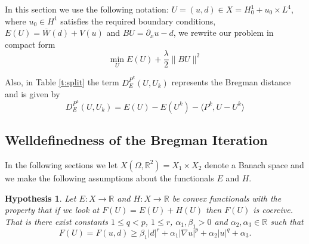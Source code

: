 \documentclass[11pt]{article}
\newcommand{\R}{\mathbb{R}}
\theoremstyle{plain}
\newtheorem{Hypothesis}[Lemma]{Hypothesis}
\begin{document}
\begin{table}[t]
    \centering
    \qquad     
    \caption{\footnotesize A) Bregman iteration. B) Error correcting algorithm.}
    \label{t:algorithms}
 \end{table}

In this section we use the following notation:  $U = (u,d) \in X = H_0^1+u_0\times L^4$,  where $u_0 \in H^1$ satisfies the required boundary conditions, $E(U) = \overline{W}(d) + V(u)$ and  $BU = \partial_x u - d$, we rewrite our problem in compact form
\[ \min_U E(U) + \frac{\lambda}{2} \|BU\|^2 \]




Also, in Table \ref{t:split} the term $D^{P^k}_E(U,U_k)$ represents the Bregman distance and is given by 
$$ D^{P^k}_E(U,U_k) = E(U) - E(U^k) - \langle P^k, U -U^k\rangle$$


\subsection{Welldefinedness of the Bregman Iteration}
In the following sections we let $X(\Omega, \R^2)= X_1 \times X_2 $ denote a Banach space and we make the following assumptions about the functionals $E$ and $H$.
\begin{Hypothesis}\label{h:mainfunc}
Let $E: X \rightarrow \R $ and $H: X \rightarrow \R$ be convex functionals with the property that if we look at $F(U) = E(U) + H(U)$ then $F(U)$ is coercive. That is there exist constants $1 \leq q <p$, $1 \leq r$, $\alpha_1, \beta _1>0 $ and $\alpha_2, \alpha_3\in \R$ such that $$F(U) = F(u,d) \geq \beta_1 | d|^r + \alpha_1 | \nabla u |^p + \alpha_2 |u|^q + \alpha_3.$$
\end{Hypothesis}
\end{document}
